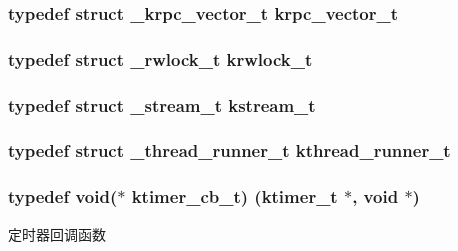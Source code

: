 \subsubsection[{krpc\+\_\+vector\+\_\+t}]{\setlength{\rightskip}{0pt plus 5cm}typedef struct {\bf \+\_\+krpc\+\_\+vector\+\_\+t} {\bf krpc\+\_\+vector\+\_\+t}}\label{a00066_af9c53e08bd04353abcdf8e0720e4c4c8_af9c53e08bd04353abcdf8e0720e4c4c8}
\hypertarget{a00066_a95d7b2a7caea750fda47edc638788908_a95d7b2a7caea750fda47edc638788908}{}
\subsubsection[{krwlock\+\_\+t}]{\setlength{\rightskip}{0pt plus 5cm}typedef struct {\bf \+\_\+rwlock\+\_\+t} {\bf krwlock\+\_\+t}}\label{a00066_a95d7b2a7caea750fda47edc638788908_a95d7b2a7caea750fda47edc638788908}
\hypertarget{a00066_acc208c4c40c875eebbfef88f00fffacf_acc208c4c40c875eebbfef88f00fffacf}{}
\subsubsection[{kstream\+\_\+t}]{\setlength{\rightskip}{0pt plus 5cm}typedef struct {\bf \+\_\+stream\+\_\+t} {\bf kstream\+\_\+t}}\label{a00066_acc208c4c40c875eebbfef88f00fffacf_acc208c4c40c875eebbfef88f00fffacf}
\hypertarget{a00066_a4f78c259c9527c821f1a6f87495dd339_a4f78c259c9527c821f1a6f87495dd339}{}
\subsubsection[{kthread\+\_\+runner\+\_\+t}]{\setlength{\rightskip}{0pt plus 5cm}typedef struct {\bf \+\_\+thread\+\_\+runner\+\_\+t} {\bf kthread\+\_\+runner\+\_\+t}}\label{a00066_a4f78c259c9527c821f1a6f87495dd339_a4f78c259c9527c821f1a6f87495dd339}
\hypertarget{a00066_a2333fd0f2c3a85faf586300ca40deed4_a2333fd0f2c3a85faf586300ca40deed4}{}
\subsubsection[{ktimer\+\_\+cb\+\_\+t}]{\setlength{\rightskip}{0pt plus 5cm}typedef void($\ast$ ktimer\+\_\+cb\+\_\+t) ({\bf ktimer\+\_\+t} $\ast$, void $\ast$)}\label{a00066_a2333fd0f2c3a85faf586300ca40deed4_a2333fd0f2c3a85faf586300ca40deed4}
定时器回调函数 \hypertarget{a00066_a024af2aa29615e7a811ea6c45438157d_a024af2aa29615e7a811ea6c45438157d}{}
